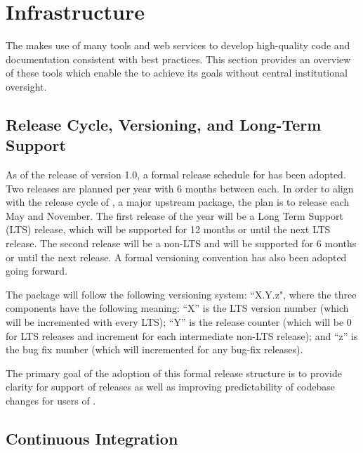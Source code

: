 \section{Infrastructure}
\label{sec:infrastructure}

The \sunpyproj makes use of many tools and web services to develop high-quality code and documentation consistent with best practices.
This section provides an overview of these tools which enable the \sunpyproj to achieve its goals without central institutional oversight.

\subsection{Release Cycle, Versioning, and Long-Term Support}
\label{sec:release}

As of the release of version 1.0, a formal release schedule for \sunpypkg has been adopted.
Two releases are planned per year with 6 months between each.
In order to align with the release cycle of \astropypkg, a major upstream package, the plan is to release each May and November.
The first release of the year will be a Long Term Support (LTS) release, which will be supported for 12 months or until the next LTS release.
The second release will be a non-LTS and will be supported for 6 months or until the next release.
A formal versioning convention has also been adopted going forward.

The \sunpypkg package will follow the following versioning system: ``X.Y.z", where the three components have the following meaning: ``X'' is the LTS version number (which will be incremented with every LTS); ``Y'' is the release counter (which will be 0 for LTS releases and increment for each intermediate non-LTS release); and ``z'' is the bug fix number (which will incremented for any bug-fix releases). 

The primary goal of the adoption of this formal release structure is to provide clarity for support of releases as well as improving predictability of codebase changes for users of \sunpypkg.

\subsection{Continuous Integration}
\label{sec:continuous-integration}

